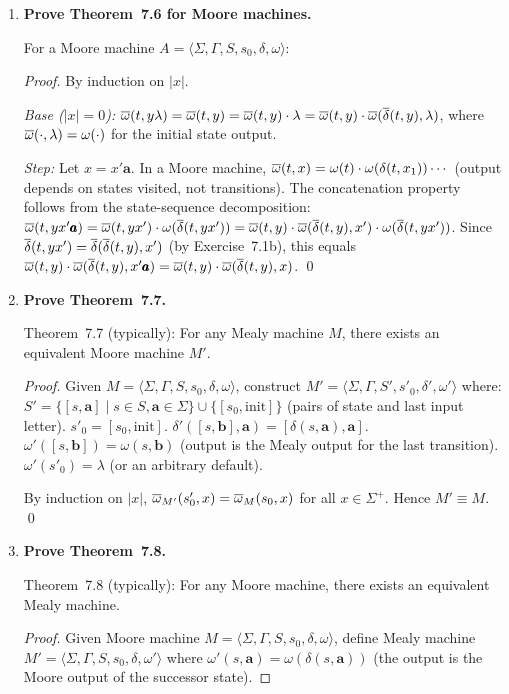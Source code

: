 \begin{enumerate}[{7.}1.]
\item \textbf{Prove Theorem~7.6 for Moore machines.}

For a Moore machine $A=\langle\Sigma,\Gamma,S,s_0,\delta,\omega\rangle$:

\begin{proof}
By induction on $|x|$.

\emph{Base ($|x|=0$):}  $\overline{\omega}(t,y\lambda)=\overline{\omega}(t,y)=\overline{\omega}(t,y)\cdot\lambda=\overline{\omega}(t,y)\cdot\overline{\omega}(\overline{\delta}(t,y),\lambda)$, where $\overline{\omega}(\cdot,\lambda)=\omega(\cdot)$ for the initial state output.

\emph{Step:}  Let $x=x'\pmb{a}$.  In a Moore machine, $\overline{\omega}(t,x)=\omega(t)\cdot\omega(\delta(t,x_1))\cdots$ (output depends on states visited, not transitions).  The concatenation property follows from the state-sequence decomposition:
$\overline{\omega}(t,yx'\pmb{a})=\overline{\omega}(t,yx')\cdot\omega(\overline{\delta}(t,yx'))=\overline{\omega}(t,y)\cdot\overline{\omega}(\overline{\delta}(t,y),x')\cdot\omega(\overline{\delta}(t,yx'))$.
Since $\overline{\delta}(t,yx')=\overline{\delta}(\overline{\delta}(t,y),x')$ (by Exercise~7.1b), this equals $\overline{\omega}(t,y)\cdot\overline{\omega}(\overline{\delta}(t,y),x'\pmb{a})=\overline{\omega}(t,y)\cdot\overline{\omega}(\overline{\delta}(t,y),x)$. \qed
\end{proof}

\item \textbf{Prove Theorem~7.7.}

Theorem~7.7 (typically): For any Mealy machine $M$, there exists an equivalent Moore machine $M'$.

\begin{proof}
Given $M=\langle\Sigma,\Gamma,S,s_0,\delta,\omega\rangle$, construct $M'=\langle\Sigma,\Gamma,S',s'_0,\delta',\omega'\rangle$ where:
$S'=\{[s,\pmb{a}]\mid s\in S,\pmb{a}\in\Sigma\}\cup\{[s_0,\text{init}]\}$ (pairs of state and last input letter).
$s'_0=[s_0,\text{init}]$.
$\delta'([s,\pmb{b}],\pmb{a})=[\delta(s,\pmb{a}),\pmb{a}]$.
$\omega'([s,\pmb{b}])=\omega(s,\pmb{b})$ (output is the Mealy output for the last transition).
$\omega'(s'_0)=\lambda$ (or an arbitrary default).

By induction on $|x|$, $\overline{\omega}_{M'}(s'_0,x)=\overline{\omega}_M(s_0,x)$ for all $x\in\Sigma^+$.  Hence $M'\equiv M$. \qed
\end{proof}

\item \textbf{Prove Theorem~7.8.}

Theorem~7.8 (typically): For any Moore machine, there exists an equivalent Mealy machine.

\begin{proof}
Given Moore machine $M=\langle\Sigma,\Gamma,S,s_0,\delta,\omega\rangle$, define Mealy machine $M'=\langle\Sigma,\Gamma,S,s_0,\delta,\omega'\rangle$ where $\omega'(s,\pmb{a})=\omega(\delta(s,\pmb{a}))$ (the output is the Moore output of the successor state).


\end{proof}
\end{enumerate}
